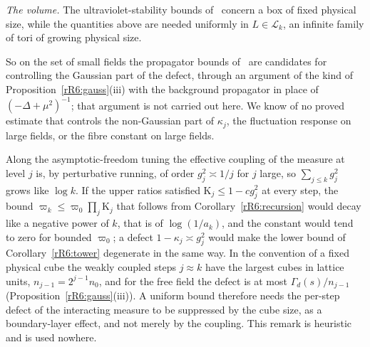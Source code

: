 \emph{The volume.} The ultraviolet-stability bounds of~\cite{Bal89a,Bal89b}
concern a box
of fixed physical size, while the quantities above are needed uniformly in
$L\in\mathcal L_k$, an infinite family of tori of growing physical size.

So on the set of small fields the propagator bounds of~\cite{Bal84a,Bal85b}
are candidates for controlling the Gaussian part of the defect,
through an argument of the kind of Proposition~\ref{rR6:gauss}(iii) with the
background propagator in place of $(-\Delta+\mu^2)^{-1}$; that argument is
not carried out here. We know of no proved estimate that controls the non-Gaussian part of
$\kappa_j$, the fluctuation response on large fields, or the fibre constant
on large fields.

\begin{remark}
\label{rR6:af}
Along the asymptotic-freedom tuning the effective coupling of the measure
at level $j$ is, by perturbative running, of order $g_j^2\asymp1/j$ for $j$ large, so $\sum_{j\le k}g_j^2$
grows like $\log k$. If the upper ratios satisfied $\mathrm K_j\le1-cg_j^2$
at every step, the bound $\varpi_k\le\varpi_0\prod_j\mathrm K_j$ that
follows from Corollary~\ref{rR6:recursion} would decay like a negative power of
$k$, that is of $\log(1/a_k)$, and the constant would tend to zero for
bounded $\varpi_0$; a defect $1-\kappa_j\asymp g_j^2$ would make the lower
bound of Corollary~\ref{rR6:tower} degenerate in the same way. In the
convention of a fixed physical cube the weakly coupled steps $j\approx k$ have the largest cubes
in lattice units, $n_{j-1}=2^{j-1}n_0$, and for the free field the defect is
at most $\Gamma_d(s)/n_{j-1}$ (Proposition~\ref{rR6:gauss}(iii)). A uniform
bound therefore needs the per-step defect of the interacting measure to be
suppressed by the cube size, as a boundary-layer effect, and not merely by
the coupling. This remark is heuristic and is used nowhere.
\end{remark}

